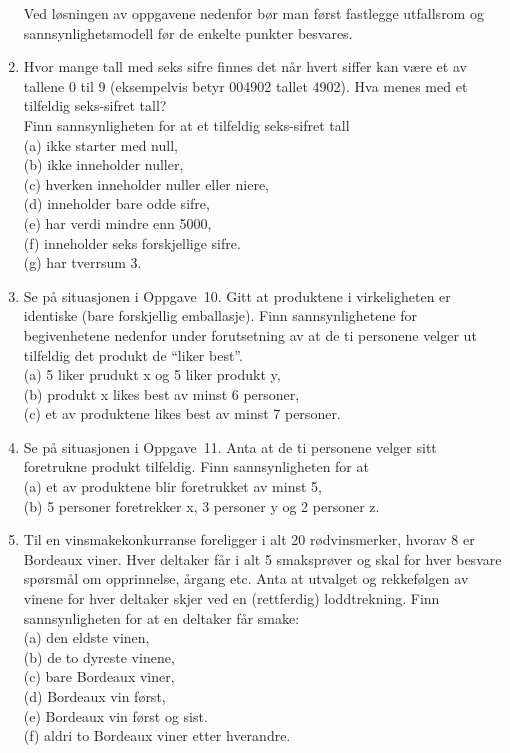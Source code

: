 \begin{enumerate}
Ved løsningen av oppgavene nedenfor bør man først fastlegge
utfallsrom og sannsynlighetsmodell før de enkelte punkter
besvares.


\item  Hvor mange tall med seks sifre finnes det når hvert siffer
     kan være et av tallene 0 til 9 (eksempelvis betyr 004902
     tallet 4902). Hva menes med et tilfeldig seks-sifret tall?\\
     Finn sannsynligheten for at et tilfeldig seks-sifret tall \\
     (a)  ikke starter med null,\\
     (b)  ikke inneholder nuller,\\
     (c)  hverken inneholder nuller eller niere,\\
     (d)  inneholder bare odde sifre,\\
     (e)  har verdi mindre enn 5000,\\
     (f)  inneholder seks forskjellige sifre.\\
     (g)  har tverrsum 3.

\item  Se på situasjonen i Oppgave~10. Gitt at produktene i
     virkeligheten er identiske (bare forskjellig emballasje).
     Finn sannsynlighetene for begivenhetene nedenfor under
     forutsetning av at de ti personene velger ut tilfeldig det
     produkt de ``liker best''.\\
     (a)  5 liker prudukt x og 5 liker produkt y,\\
     (b)  produkt x likes best av minst 6 personer,\\
     (c)  et av produktene likes best av minst 7 personer.

\item  Se på situasjonen i Oppgave~11. Anta at de ti personene
     velger sitt foretrukne produkt tilfeldig. Finn
     sannsynligheten for at\\
     (a)  et av produktene blir foretrukket av minst 5,\\
     (b)  5 personer foretrekker x, 3 personer y og 2 personer z.
              
\item  Til en vinsmakekonkurranse foreligger i alt 20
     rødvinsmerker, hvorav 8 er Bordeaux viner. Hver deltaker får
     i alt 5 smaksprøver og skal for hver besvare spørsmål om
     opprinnelse, årgang etc. Anta at utvalget og rekkefølgen av
     vinene for hver deltaker skjer ved en (rettferdig)
     loddtrek\-ning. Finn sannsynligheten for at en deltaker får
     smake:\\
     (a)  den eldste vinen,\\
     (b)  de to dyreste vinene,\\
     (c)  bare Bordeaux viner,\\
     (d)  Bordeaux vin først,\\
     (e)  Bordeaux vin først og sist.\\
     (f)  aldri to Bordeaux viner etter hverandre.


\end{enumerate}
